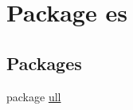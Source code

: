\hypertarget{namespacees}{\section{Package es}
\label{namespacees}
}
\subsection*{Packages}
\begin{DoxyCompactItemize}
\item 
package \hyperlink{namespacees_1_1ull}{ull}
\end{DoxyCompactItemize}
